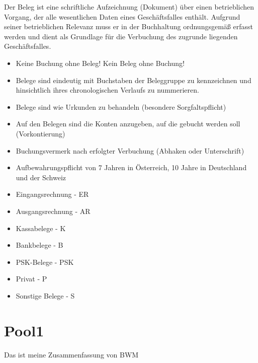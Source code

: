\documentclass[letterpaper,10pt,english]{sphinxmanual}
\begin{document}
Der Beleg ist eine schriftliche Aufzeichnung (Dokument) über einen betrieblichen Vorgang, der alle wesentlichen Daten eines Geschäftsfalles enthält. Aufgrund seiner betrieblichen Relevanz muss er in der Buchhaltung ordnungsgemäß erfasst werden und dient als Grundlage für die Verbuchung des zugrunde liegenden Geschäftsfalles.

\begin{itemize}
\item {} 
Keine Buchung ohne Beleg! Kein Beleg ohne Buchung!

\item {} 
Belege sind eindeutig mit Buchstaben der Beleggruppe zu kennzeichnen und hinsichtlich ihres chronologischen Verlaufs zu nummerieren.

\item {} 
Belege sind wie Urkunden zu behandeln (besondere Sorgfaltspflicht)

\item {} 
Auf den Belegen sind die Konten anzugeben, auf die gebucht werden soll (Vorkontierung)

\item {} 
Buchungsvermerk nach erfolgter Verbuchung (Abhaken oder Unterschrift)

\item {} 
Aufbewahrungspflicht von 7 Jahren in Österreich, 10 Jahre in Deutschland und der Schweiz

\end{itemize}

\begin{itemize}
\item {} 
Eingangsrechnung - ER

\item {} 
Ausgangsrechnung - AR

\item {} 
Kassabelege - K

\item {} 
Bankbelege - B

\item {} 
PSK-Belege - PSK

\item {} 
Privat - P

\item {} 
Sonstige Belege - S

\end{itemize}


\chapter{Pool1}
\label{\detokenize{pool2:pool1}}\label{\detokenize{pool2::doc}}
Das ist meine Zusammenfassung von BWM
\end{document}
